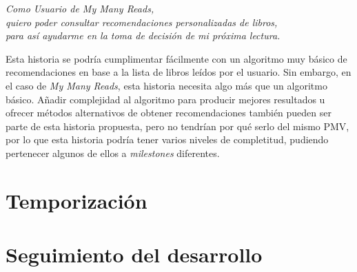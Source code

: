\begin{center}
    \textit{Como Usuario de My Many Reads,}\\
    \textit{quiero poder consultar recomendaciones personalizadas de libros,}\\
    \textit{para así ayudarme en la toma de decisión de mi próxima lectura.}
\end{center}

Esta historia se podría cumplimentar fácilmente con un algoritmo muy básico de recomendaciones en base a la lista de libros leídos por el usuario. Sin embargo, en el caso de \textit{My Many Reads}, esta historia necesita algo más que un algoritmo básico. Añadir complejidad al algoritmo para producir mejores resultados u ofrecer métodos alternativos de obtener recomendaciones también pueden ser parte de esta historia propuesta, pero no tendrían por qué serlo del mismo PMV, por lo que esta historia podría tener varios niveles de completitud, pudiendo pertenecer algunos de ellos a \textit{milestones} diferentes.

\section{Temporización}

\section{Seguimiento del desarrollo}
